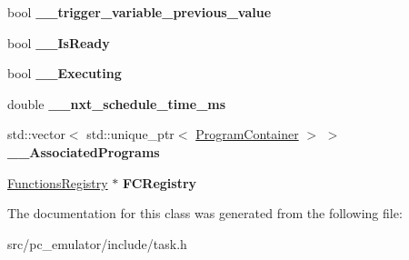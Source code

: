 \begin{DoxyCompactItemize}
\item 
bool {\bfseries \+\_\+\+\_\+trigger\+\_\+variable\+\_\+previous\+\_\+value}\hypertarget{classpc__emulator_1_1Task_a8ad0a6048c55a4496435b0b9517608ad}{}\label{classpc__emulator_1_1Task_a8ad0a6048c55a4496435b0b9517608ad}

\item 
bool {\bfseries \+\_\+\+\_\+\+Is\+Ready}\hypertarget{classpc__emulator_1_1Task_a1e5f3bfb642ce598ffcb2a7b52b34e83}{}\label{classpc__emulator_1_1Task_a1e5f3bfb642ce598ffcb2a7b52b34e83}

\item 
bool {\bfseries \+\_\+\+\_\+\+Executing}\hypertarget{classpc__emulator_1_1Task_ac412ee6b07980e88cfbb2ae46fb006ba}{}\label{classpc__emulator_1_1Task_ac412ee6b07980e88cfbb2ae46fb006ba}

\item 
double {\bfseries \+\_\+\+\_\+nxt\+\_\+schedule\+\_\+time\+\_\+ms}\hypertarget{classpc__emulator_1_1Task_aebf00535089b78623b641fe7de77c5df}{}\label{classpc__emulator_1_1Task_aebf00535089b78623b641fe7de77c5df}

\item 
std\+::vector$<$ std\+::unique\+\_\+ptr$<$ \hyperlink{classpc__emulator_1_1ProgramContainer}{Program\+Container} $>$ $>$ {\bfseries \+\_\+\+\_\+\+Associated\+Programs}\hypertarget{classpc__emulator_1_1Task_a930efc75d9989d4f4b2d896bcf6801a5}{}\label{classpc__emulator_1_1Task_a930efc75d9989d4f4b2d896bcf6801a5}

\item 
\hyperlink{classpc__emulator_1_1FunctionsRegistry}{Functions\+Registry} $\ast$ {\bfseries F\+C\+Registry}\hypertarget{classpc__emulator_1_1Task_a4e5e7a4941d487f66ff127d5a3d08499}{}\label{classpc__emulator_1_1Task_a4e5e7a4941d487f66ff127d5a3d08499}

\end{DoxyCompactItemize}


The documentation for this class was generated from the following file\+:\begin{DoxyCompactItemize}
\item 
src/pc\+\_\+emulator/include/task.\+h\end{DoxyCompactItemize}
